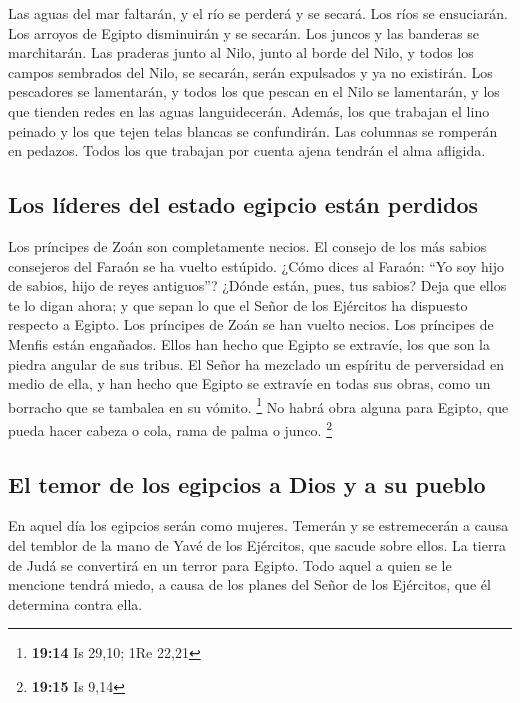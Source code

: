  Las aguas del mar faltarán, y el río se perderá y se
secará.  Los ríos se ensuciarán. Los arroyos de Egipto
disminuirán y se secarán. Los juncos y las banderas se marchitarán.
 Las praderas junto al Nilo, junto al borde del Nilo, y
todos los campos sembrados del Nilo, se secarán, serán expulsados y ya
no existirán.  Los pescadores se lamentarán, y todos los
que pescan en el Nilo se lamentarán, y los que tienden redes en las
aguas languidecerán.  Además, los que trabajan el lino
peinado y los que tejen telas blancas se confundirán. 
Las columnas se romperán en pedazos. Todos los que trabajan por cuenta
ajena tendrán el alma afligida.

\hypertarget{los-luxedderes-del-estado-egipcio-estuxe1n-perdidos}{%
\subsection{Los líderes del estado egipcio están
perdidos}\label{los-luxedderes-del-estado-egipcio-estuxe1n-perdidos}}

 Los príncipes de Zoán son completamente necios. El
consejo de los más sabios consejeros del Faraón se ha vuelto estúpido.
¿Cómo dices al Faraón: ``Yo soy hijo de sabios, hijo de reyes
antiguos''?  ¿Dónde están, pues, tus sabios? Deja que
ellos te lo digan ahora; y que sepan lo que el Señor de los Ejércitos ha
dispuesto respecto a Egipto.  Los príncipes de Zoán se
han vuelto necios. Los príncipes de Menfis están engañados. Ellos han
hecho que Egipto se extravíe, los que son la piedra angular de sus
tribus.  El Señor ha mezclado un espíritu de perversidad
en medio de ella, y han hecho que Egipto se extravíe en todas sus obras,
como un borracho que se tambalea en su vómito. \footnote{\textbf{19:14}
  Is 29,10; 1Re 22,21}  No habrá obra alguna para Egipto,
que pueda hacer cabeza o cola, rama de palma o junco. \footnote{\textbf{19:15}
  Is 9,14}

\hypertarget{el-temor-de-los-egipcios-a-dios-y-a-su-pueblo}{%
\subsection{El temor de los egipcios a Dios y a su
pueblo}\label{el-temor-de-los-egipcios-a-dios-y-a-su-pueblo}}

 En aquel día los egipcios serán como mujeres. Temerán y
se estremecerán a causa del temblor de la mano de Yavé de los Ejércitos,
que sacude sobre ellos.  La tierra de Judá se convertirá
en un terror para Egipto. Todo aquel a quien se le mencione tendrá
miedo, a causa de los planes del Señor de los Ejércitos, que él
determina contra ella.

